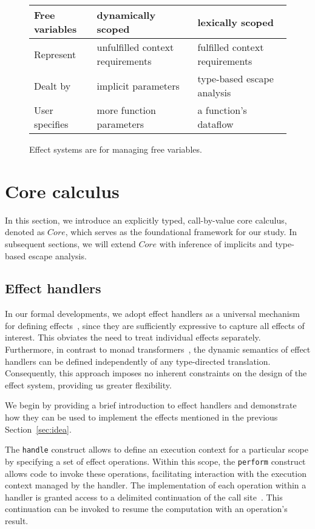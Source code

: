 \documentclass[acmsmall,review,screen]{acmart}
\begin{document}
\begin{figure}
    \centering
    \begin{tabular}{|l|l|l|}
        \hline
        Free variables & dynamically scoped & lexically scoped \\
        \hline
        Represent & unfulfilled context requirements & fulfilled context requirements \\
        Dealt by & implicit parameters & type-based escape analysis \\
        User specifies & more function parameters & a function’s dataflow \\
        \hline
    \end{tabular}
    \caption{Effect systems are for managing free variables.}
    \label{fig:free-vars}
\end{figure}


\section{Core calculus} \label{sec:core}

In this section, we introduce an explicitly typed, call-by-value core calculus, denoted as $Core$, which serves as the foundational framework for our study.
In subsequent sections, we will extend $Core$ with inference of implicits and type-based escape analysis.

\subsection{Effect handlers} \label{subsec:handlers}

In our formal developments, we adopt effect handlers as a universal mechanism for defining effects~\cite{plotkin2003algebraic, plotkin2013handling}, since they are sufficiently expressive to capture all effects of interest.
This obviates the need to treat individual effects separately.
Furthermore, in contrast to monad transformers~\cite{liang1995monad, schrijvers2019monad}, the dynamic semantics of effect handlers can be defined independently of any type-directed translation.
Consequently, this approach imposes no inherent constraints on the design of the effect system, providing us greater flexibility.

We begin by providing a brief introduction to effect handlers and demonstrate how they can be used to implement the effects mentioned in the previous Section~\ref{sec:idea}.

The \lstinline[language=colang]{handle} construct allows to define an execution context for a particular scope by specifying a set of effect operations.
Within this scope, the \lstinline[language=colang]{perform} construct allows code to invoke these operations, facilitating interaction with the execution context managed by the handler.
The implementation of each operation within a handler is granted access to a delimited continuation of the call site~\cite{dyvbig2007monadic}.
This continuation can be invoked to resume the computation with an operation's result.
\end{document}
